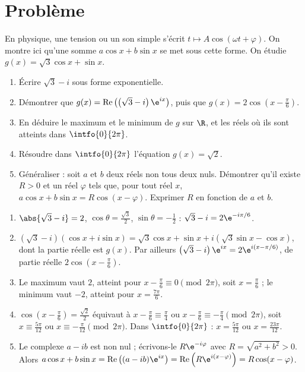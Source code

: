 \section{Problème}
\begin{problem}
En physique, une tension ou un son simple s'écrit $t\mapsto A\cos(\omega t+\varphi)$. On montre ici qu'une somme $a\cos x+b\sin x$ se met sous cette forme. On étudie $g(x)=\sqrt3\cos x+\sin x$.
\begin{enumerate}
\item Écrire $\sqrt3-i$ sous forme exponentielle.
\item Démontrer que $g(x)=\operatorname{Re}\left(\left(\sqrt3-i\right)\e^{ix}\right)$, puis que $g(x)=2\cos\left(x-\frac\pi6\right)$.
\item En déduire le maximum et le minimum de $g$ sur $\R$, et les réels où ils sont atteints dans $\intfo{0}{2\pi}$.
\item Résoudre dans $\intfo{0}{2\pi}$ l'équation $g(x)=\sqrt2$.
\item Généraliser : soit $a$ et $b$ deux réels non tous deux nuls. Démontrer qu'il existe $R>0$ et un réel $\varphi$ tels que, pour tout réel $x$, $a\cos x+b\sin x=R\cos(x-\varphi)$. Exprimer $R$ en fonction de $a$ et $b$.
\end{enumerate}
\end{problem}
\begin{solution}[Problème]
\begin{enumerate}
\item $\abs{\sqrt3-i}=2$, $\cos\theta=\frac{\sqrt3}2$, $\sin\theta=-\frac12$ : $\sqrt3-i=2\e^{-i\pi/6}$.
\item $\left(\sqrt3-i\right)(\cos x+i\sin x)=\sqrt3\cos x+\sin x+i\left(\sqrt3\sin x-\cos x\right)$, dont la partie réelle est $g(x)$. Par ailleurs $\left(\sqrt3-i\right)\e^{ix}=2\e^{i(x-\pi/6)}$, de partie réelle $2\cos\left(x-\frac\pi6\right)$.
\item Le maximum vaut $2$, atteint pour $x-\frac\pi6\equiv0\pmod{2\pi}$, soit $x=\frac\pi6$ ; le minimum vaut $-2$, atteint pour $x=\frac{7\pi}6$.
\item $\cos\left(x-\frac\pi6\right)=\frac{\sqrt2}2$ équivaut à $x-\frac\pi6\equiv\frac\pi4$ ou $x-\frac\pi6\equiv-\frac\pi4\pmod{2\pi}$, soit $x\equiv\frac{5\pi}{12}$ ou $x\equiv-\frac\pi{12}\pmod{2\pi}$. Dans $\intfo{0}{2\pi}$ : $x=\frac{5\pi}{12}$ ou $x=\frac{23\pi}{12}$.
\item Le complexe $a-ib$ est non nul ; écrivons-le $R\e^{-i\varphi}$ avec $R=\sqrt{a^2+b^2}>0$. Alors $a\cos x+b\sin x=\operatorname{Re}\left((a-ib)\e^{ix}\right)=\operatorname{Re}\left(R\e^{i(x-\varphi)}\right)=R\cos(x-\varphi)$.
\end{enumerate}
\end{solution}
